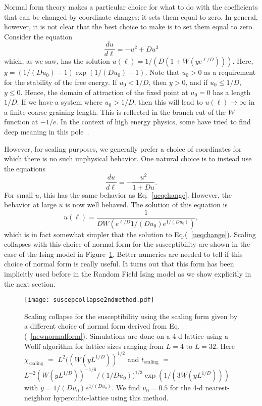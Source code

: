 \documentclass[
 reprint,
 amsmath,amssymb,
 aps, superscriptaddress, pre
]{revtex4-1}
\begin{document}
Normal form theory makes a particular choice for what to do with the coefficients that can be changed by coordinate changes: it sets them equal to zero. In general, however, it is not clear that the best choice to make is to set them equal to zero. Consider the equation
\begin{equation}
 \frac{d u}{d \ell} = - u^2 + D u^3 
 \label{ueqchange}
\end{equation}
which, as we saw, has the solution $u(\ell) = 1 /(D (1 + W(y e^{\ell/D})))$. Here, $y = (1/(D u_0)-1) \exp(1/(D u_0)-1)$. Note that $u_0 > 0$ as a requirement for the stability of the free energy. If $u_0 < 1/D$, then $y > 0$, and if $u_0 \leq 1/D$, $y \leq 0$. Hence, the domain of attraction of the fixed point at $u_0 = 0$ has a length $1/D$. If we have a system where $u_0 > 1/D$, then this will lead to $u(\ell) \rightarrow \infty$ in a finite coarse graining length. This is reflected in the branch cut of the $W$ function at $-1/e$. In the context of high energy physics, some have tried to find deep meaning in this pole~\cite{magradze}. 

However, for scaling purposes, we generally prefer a choice of coordinates for which there is no such unphysical behavior. One natural choice is to instead use the equations 
\begin{equation}
 \frac{d u}{d \ell} = - \frac{u^2}{1 + D u} . 
 \label{newnormalform}
\end{equation}
For small $u$, this has the same behavior as Eq.~\ref{ueqchange}. However, the behavior at large $u$ is now well behaved. The solution of this equation is 
\begin{equation}
 u(\ell) = \frac{1}{D W(e^{\ell/D} 1/(D u_0) e^{1/(D u_0)})} ,
\end{equation}
which is in fact somewhat simpler that the solution to Eq.(~\ref{ueqchange}). Scaling collapses with this choice of normal form for the susceptibility are shown in the case of the Ising model in Figure~\ref{collapses2ndmethod}. Better numerics are needed to tell if this choice of normal form is really useful. It turns out that this form has been implicitly used before in the Random Field Ising model as we show explicitly in the next section.

\begin{figure}
 \texttt{[image: suscepcollapse2ndmethod.pdf]}
 \caption{Scaling collapse for the susceptibility using the scaling form given by a different choice of normal form derived from Eq.(~\ref{newnormalform}). Simulations are done on a 4-d lattice using a Wolff algorithm for lattice sizes ranging from $L = 4$ to $L = 32$. Here $\chi_\mathrm{scaling}$ $=$ $L^2 ((W(y L^{1/D}))^{1/2}$ and $t_{\mathrm{scaling}}$ $=$ $L^{-2} (W(y L^{1/D}))^{-1/6}/(1/D u_0))^{1/3} \exp(1/(3 W(y L^{1/D}))) $ with $y = 1/(D u_0) e^{1/(D u_0)}$. We find $u_0 = 0.5$ for the 4-d nearest-neighbor hypercubic-lattice using this method.}
\label{collapses2ndmethod}
 \end{figure}
\end{document}
